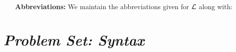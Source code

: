 \documentclass[a4paper, 11pt]{article} %
\begin{document}
\begin{enumerate}[leftmargin=1.2in]
	\item[\bf Abbreviations:] We maintain the abbreviations given for $\mathcal{L}$ along with:
	      \begin{itemize}
	      \end{itemize}
\end{enumerate}




\section*{\it Problem Set: Syntax}
\end{document}
